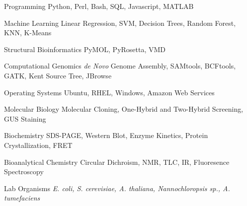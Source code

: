 \vspace{2mm}


\begin{cvskills}

  \cvskill
    {Programming} %
    {Python, Perl, Bash, SQL, Javascript, MATLAB} %

  \cvskill
    {Machine Learning} %
    {Linear Regression, SVM, Decision Trees, Random Forest, KNN, K-Means} %
    
  \cvskill
    {Structural Bioinformatics} %
    {PyMOL, PyRosetta, VMD} %

  \cvskill
    {Computational Genomics} %
    {\textit{de Novo} Genome Assembly, SAMtools, BCFtools, GATK, Kent Source Tree, JBrowse} %

  \cvskill
    {Operating Systems} %
    {Ubuntu, RHEL, Windows, Amazon Web Services} %

  \cvskill
    {Molecular Biology} %
    {Molecular Cloning, One-Hybrid and Two-Hybrid Screening, GUS Staining} %

  \cvskill
    {Biochemistry} %
    {SDS-PAGE, Western Blot, Enzyme Kinetics, Protein Crystallization, FRET} %

  \cvskill
    {Bioanalytical Chemistry} %
    {Circular Dichroism, NMR, TLC, IR, Fluoresence Spectroscopy} %

  \cvskill
    {Lab Organisms} %
    {\textit{E. coli, S. cerevisiae, A. thaliana, Nannochloropsis sp., A. tumefaciens}} %
    
\vspace{-8.0mm}
\end{cvskills}